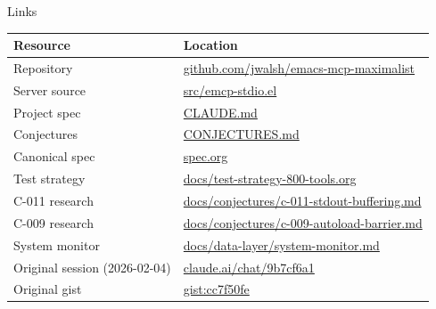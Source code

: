 \documentclass[presentation]{beamer}
\begin{document}
\begin{frame}[label={sec:org1517a9e}]{Links}
\begin{center}
\begin{tabular}{ll}
Resource & Location\\
\hline
Repository & \href{https://github.com/jwalsh/emacs-mcp-maximalist}{github.com/jwalsh/emacs-mcp-maximalist}\\
Server source & \href{../../../src/emcp-stdio.el}{src/emcp-stdio.el}\\
Project spec & \href{../../../CLAUDE.md}{CLAUDE.md}\\
Conjectures & \href{../../../CONJECTURES.md}{CONJECTURES.md}\\
Canonical spec & \href{../../../spec.org}{spec.org}\\
Test strategy & \href{../../test-strategy-800-tools.org}{docs/test-strategy-800-tools.org}\\
C-011 research & \href{../../conjectures/c-011-stdout-buffering.md}{docs/conjectures/c-011-stdout-buffering.md}\\
C-009 research & \href{../../conjectures/c-009-autoload-barrier.md}{docs/conjectures/c-009-autoload-barrier.md}\\
System monitor & \href{../../data-layer/system-monitor.md}{docs/data-layer/system-monitor.md}\\
Original session (2026-02-04) & \href{https://claude.ai/chat/9b7cf6a1-cd64-4eae-bb33-28e370783c20}{claude.ai/chat/9b7cf6a1}\\
Original gist & \href{https://gist.github.com/aygp-dr/cc7f50fece2107f8c5b566d1f9cf38ad}{gist:cc7f50fe}\\
\end{tabular}
\end{center}
\end{frame}
\end{document}
